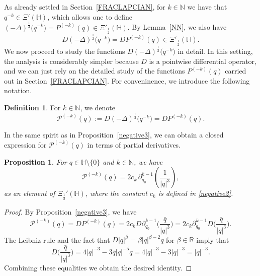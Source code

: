 \documentclass[reqno,11pt]{amsart}
\newtheorem{proposition}[theorem]{Proposition}
\theoremstyle{definition}
\newtheorem{definition}[theorem]{Definition}
\def\R{\mathbb{R}}
\begin{document}
As already settled in Section~\ref{FRACLAPCIAN}, for $k\in \mathbb{N}$ we have that $q^{-k}\in \Xi'(\mathbb{H})$, which allows one to define $(-\Delta)^\frac{1}{2}\big(q^{-k}\big)=P^{(-k)}(q)\in \Xi'_{\frac{1}{2}}(\mathbb{H})$. By Lemma~\ref{NN}, we also have
\begin{equation}
\label{app}
D(-\Delta)^\frac{1}{2}\big(q^{-k}\big)=DP^{(-k)}(q)\in \Xi'_{\frac{1}{2}}(\mathbb{H}).
\end{equation}
We now proceed to study the functions $D(-\Delta)^\frac{1}{2}\big(q^{-k}\big)$ in detail. In this setting, the analysis is considerably simpler because $D$ is a pointwise differential operator, and we can just rely on the detailed study of the functions $P^{(-k)}(q)$ carried out in Section~\ref{FRACLAPCIAN}. For conveninence, we introduce the following notation.

\begin{definition}
	For $k \in \mathbb{N}$, we denote
	\begin{equation}
		\label{harmN1}
		\mathcal{P}^{(-k)}(q):=D (-\Delta)^{\frac{1}{2}} \big(q^{-k}\big) = DP^{(-k)}(q).
	\end{equation}
\end{definition}

In the same spirit as in Proposition~\ref{negative3}, we can obtain a closed expression for $\mathcal{P}^{(-k)}(q)$ in terms of partial derivatives.


\begin{proposition}
\label{negH}
For $q \in \mathbb{H} \setminus \{0\}$ and $k \in \mathbb{N}$, we have
\begin{equation*}
	\label{nehH1}
	\mathcal{P}^{(-k)}(q)= 2c_k \, \partial_{q_0}^{k-1} \left( \frac{1}{|q|^{3}}\right),
\end{equation*}
as an element of $\Xi_{\frac{1}{2}}'(\mathbb{H})$, where the constant $c_k$ is defined in \eqref{negative2}.
\end{proposition}
\begin{proof}
	By Proposition~\ref{negative3}, we have
\begin{equation*}
	\label{oneh}
\mathcal{P}^{(-k)}(q)=D P^{(-k)}(q)=2c_k D \partial_{q_0}^{k-1}\bigg( \frac{\bar{q}}{|q|^{3}} \bigg)=2c_k\partial_{q_0}^{k-1} D \bigg( \frac{\bar{q}}{|q|^{3}} \bigg).
\end{equation*}
The Leibniz rule and the fact that $D|q|^{\beta}= \beta |q|^{\beta-2}q$ for $\beta\in \R$ imply that
\begin{equation*}
\label{twoh}
D \bigg( \frac{\bar{q}}{|q|^{3}} \bigg)=4 |q|^{-3}- 3\bar{q} |q|^{-5}q=4 |q|^{-3}-3|q|^{-3}=|q|^{-3}.
\end{equation*}
Combining these equalities we obtain the desired identity.
\end{proof}
\end{document}
